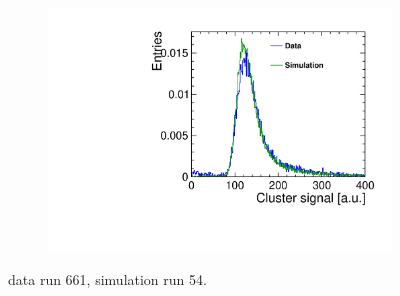 \begin{figure}[htbp]
\begin{subfigure}[b]{0.3\textwidth}
    \caption{}
  \end{subfigure}\hfill
  \begin{subfigure}[b]{0.3\textwidth}
    \includegraphics[width=\textwidth]{figures/Telescope/biasedResiduals/clusterSignal_telescope0_data_simu.pdf}
    \caption{}
  \end{subfigure}
  \caption{data run 661, simulation run 54.}
  \label{fig:TelescopeCluSize_data_simu}
\end{figure}

